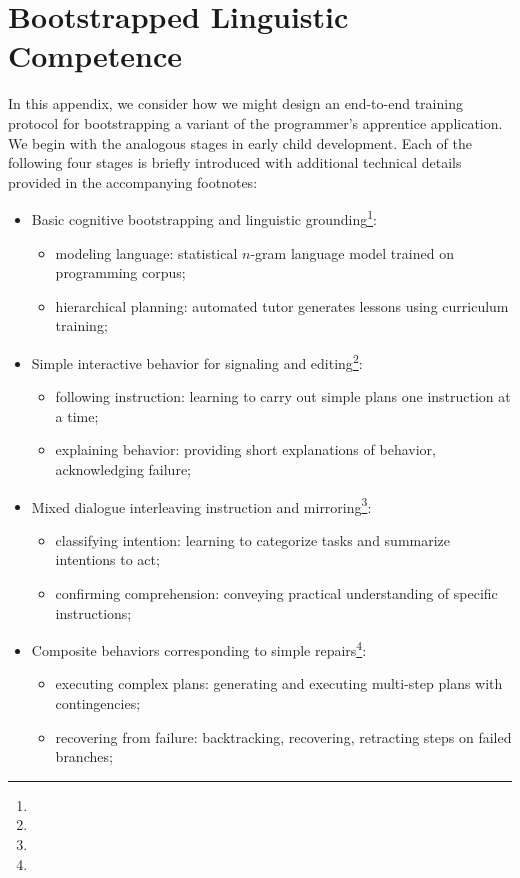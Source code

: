 
\section{Bootstrapped Linguistic Competence}


In this appendix, we consider how we might design an end-to-end training protocol for bootstrapping a variant of the programmer's apprentice application. We begin with the analogous stages in early child development. Each of the following four stages is briefly introduced with additional technical details provided in the accompanying footnotes:
%
\begin{itemize}
%
\item Basic cognitive bootstrapping and linguistic grounding\footnote{}: %
%
  \begin{itemize}
%
  \item modeling language: statistical $n$-gram language model trained on programming corpus;
%
  \item hierarchical planning: automated tutor generates lessons using curriculum training;
%
  \end{itemize}
%
\item Simple interactive behavior for signaling and editing\footnote{}: %
%
  \begin{itemize}
%
  \item following instruction: learning to carry out simple plans one instruction at a time;
%
  \item explaining behavior: providing short explanations of behavior, acknowledging failure;
%
  \end{itemize}
%
\item Mixed dialogue interleaving instruction and mirroring\footnote{}: %
%
  \begin{itemize}
%
  \item classifying intention: learning to categorize tasks and summarize intentions to act;
%
  \item confirming comprehension: conveying practical understanding of specific instructions;
%
  \end{itemize}
%
\item Composite behaviors corresponding to simple repairs\footnote{}: %
%
  \begin{itemize}
%
  \item executing complex plans: generating and executing multi-step plans with contingencies;
%
  \item recovering from failure: backtracking, recovering, retracting steps on failed branches;
%
  \end{itemize}
%
\end{itemize}

